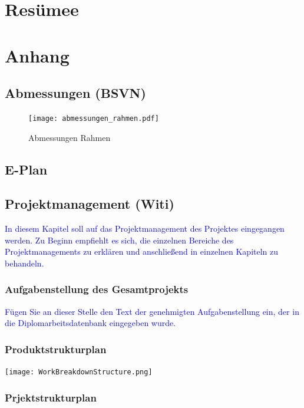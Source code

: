 
\section{Resümee}


\section{Anhang}

\subsection{Abmessungen (BSVN)}

\begin{figure}[H]
    \texttt{[image: abmessungen\_rahmen.pdf]}
    \centering
    \caption{Abmessungen Rahmen}
\end{figure}


\subsection{E-Plan}

\subsection{Projektmanagement (Witi)}
\textcolor{blue}{In diesem Kapitel soll auf das Projektmanagement des Projektes eingegangen werden. Zu Beginn empfiehlt es sich, die einzelnen Bereiche des Projektmanagements zu erklären und anschließend in einzelnen Kapiteln zu behandeln.}

\subsubsection{Aufgabenstellung des Gesamtprojekts}
\textcolor{blue}{Fügen Sie an dieser Stelle den Text der genehmigten Aufgabenstellung ein, der in die Diplomarbeitsdatenbank  eingegeben wurde.}

\subsubsection{Produktstrukturplan}
\vspace{5mm}

\bgroup
    \centering
    \texttt{[image: WorkBreakdownStructure.png]}
\egroup

\subsubsection{Prjektstrukturplan}
\vspace{5mm}

